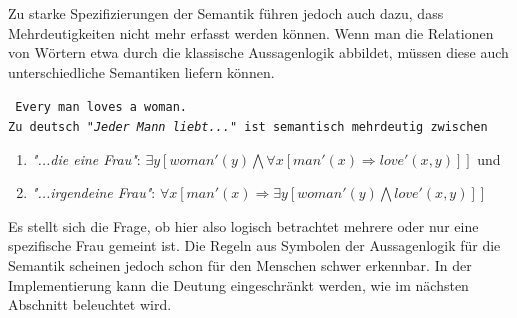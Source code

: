 \documentclass[12pt]{report}
\begin{document}
Zu starke Spezifizierungen der Semantik führen jedoch auch dazu, dass Mehrdeutigkeiten nicht mehr erfasst werden können. Wenn man die Relationen von Wörtern etwa durch die klassische Aussagenlogik abbildet, müssen diese auch unterschiedliche Semantiken liefern können.

\tt
Every man loves a woman.
\rm
\\
Zu deutsch \textit{"Jeder Mann liebt..."} ist semantisch mehrdeutig zwischen  
\begin{enumerate}
\item \textit{"...die eine Frau"}: $\exists y [woman'(y) \bigwedge \forall x [man'(x) \Rightarrow love'(x,y)]]$ und
\item \textit{"...irgendeine Frau"}: $\forall x [man'(x) \Rightarrow \exists y [woman'(y) \bigwedge love'(x,y)]]$
\end{enumerate}


Es stellt sich die Frage, ob hier also logisch betrachtet mehrere oder nur eine spezifische Frau gemeint ist. Die Regeln aus Symbolen der Aussagenlogik für die Semantik scheinen jedoch schon für den Menschen schwer erkennbar. In der Implementierung kann die Deutung eingeschränkt werden, wie im nächsten Abschnitt beleuchtet wird.
\end{document}
